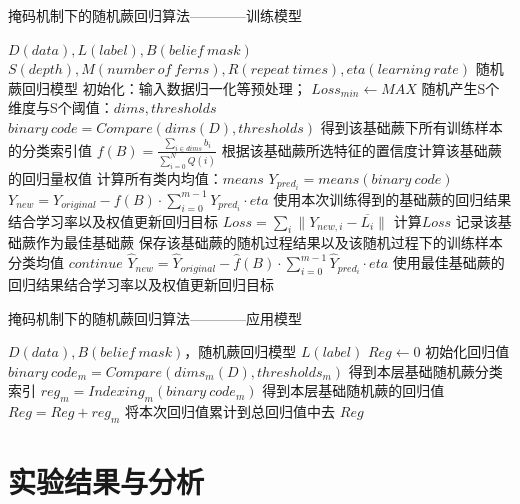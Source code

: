 \begin{algorithm}
\caption{掩码机制下的随机蕨回归算法————训练模型}
\begin{algorithmic}[1]
\Require $D(data), L(label), B(belief\ mask)$
\Require $S(depth), M(number\ of\ ferns), R(repeat\ times), eta(learning\ rate)$
\Ensure 随机蕨回归模型
\State 初始化：输入数据归一化等预处理；
	\State $Loss_{min}\leftarrow MAX$
		\State 随机产生S个维度与S个阈值：$dims, thresholds$
		\State $binary\ code=Compare(dims(D), thresholds)$
		\State \Comment 得到该基础蕨下所有训练样本的分类索引值
		\State $f(B)=\frac{\sum_{i\in dims} b_i}{\sum_{i=0}^{N} Q(i)}$
		\State \Comment 根据该基础蕨所选特征的置信度计算该基础蕨的回归量权值
		\State 计算所有类内均值：$means$
		\State $Y_{pred_i}=means(binary\ code)$
		\State $Y_{new}=Y_{original}-f(B)\cdot \sum_{i=0}^{m-1} Y_{pred_i}\cdot eta$
		\State \Comment 使用本次训练得到的基础蕨的回归结果结合学习率以及权值更新回归目标
		\State $Loss=\sum_i{\|Y_{new,i}-\overline{L_i}\|}$
		\State \Comment 计算$Loss$
			\State 记录该基础蕨作为最佳基础蕨
			\State 保存该基础蕨的随机过程结果以及该随机过程下的训练样本分类均值
		\Else 
			\State $continue$
		\EndIf
	\State $\hat{Y}_{new}=\hat{Y}_{original}-\hat{f}(B)\cdot \sum_{i=0}^{m-1} \hat{Y}_{pred_i}\cdot eta$
	\State \Comment 使用最佳基础蕨的回归结果结合学习率以及权值更新回归目标
	\EndFor
\EndFor
\end{algorithmic}
\end{algorithm}

\begin{algorithm}
\caption{掩码机制下的随机蕨回归算法————应用模型}
\begin{algorithmic}[1]
\Require $D(data), B(belief\ mask)$，随机蕨回归模型
\Ensure $L(label)$
\State $Reg\leftarrow 0$
\Comment 初始化回归值
	\State $binary\ code_m=Compare(dims_m(D), thresholds_m)$
	\Comment 得到本层基础随机蕨分类索引
	\State $reg_m=Indexing_m(binary\ code_m)$
	\Comment 得到本层基础随机蕨的回归值
	\State $Reg=Reg+reg_m$
	\Comment 将本次回归值累计到总回归值中去
\EndFor
\State \Return $Reg$
\end{algorithmic}
\end{algorithm}


\newpage

\section{实验结果与分析} %

